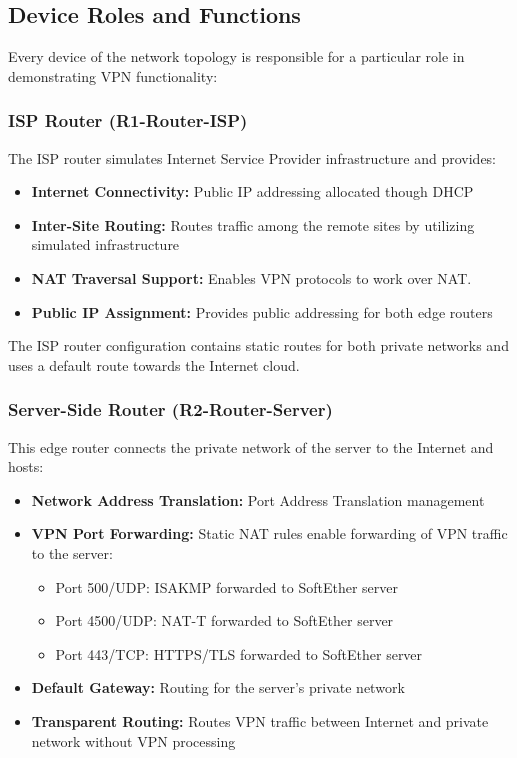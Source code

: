 \subsection{Device Roles and Functions}

Every device of the network topology is responsible for a particular role in demonstrating VPN functionality:

\subsubsection{ISP Router (R1-Router-ISP)}

The ISP router simulates Internet Service Provider infrastructure and provides:

\begin{itemize}
    \item \textbf{Internet Connectivity:} Public IP addressing allocated though DHCP
    \item \textbf{Inter-Site Routing:} Routes traffic among the remote sites by utilizing simulated infrastructure
    \item \textbf{NAT Traversal Support:} Enables VPN protocols to work over NAT.
    \item \textbf{Public IP Assignment:} Provides public addressing for both edge routers
\end{itemize}

The ISP router configuration contains static routes for both private networks and uses a default route towards the Internet cloud.

\subsubsection{Server-Side Router (R2-Router-Server)}

This edge router connects the private network of the server to the Internet and hosts:

\begin{itemize}
    \item \textbf{Network Address Translation:} Port Address Translation management
    \item \textbf{VPN Port Forwarding:} Static NAT rules enable forwarding of VPN traffic to the server:
        \begin{itemize}
            \item Port 500/UDP: ISAKMP forwarded to SoftEther server
            \item Port 4500/UDP: NAT-T forwarded to SoftEther server
            \item Port 443/TCP: HTTPS/TLS forwarded to SoftEther server
        \end{itemize}
    \item \textbf{Default Gateway:} Routing for the server's private network
    \item \textbf{Transparent Routing:} Routes VPN traffic between Internet and private network without VPN processing
\end{itemize}

